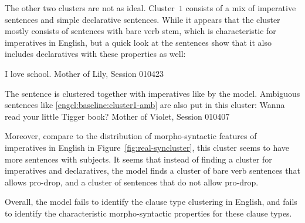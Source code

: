 The other two clusters are not as ideal. Cluster~$1$ consists of a mix of imperative sentences and simple declarative sentences. While it appears that the cluster mostly consists of sentences with bare verb stem, which is characteristic for imperatives in English, but a quick look at the sentences show that it also includes declaratives with these properties as well:

\ex I love school. \hfill Mother of Lily, Session 010423
\eex

The sentence is clustered together with imperatives like  by the model. Ambiguous sentences like \ref{engcl:baseline:cluster1-amb} are also put in this cluster:
Wanna read your little Tigger book? \hfill Mother of Violet, Session 010407
\eex

Moreover, compare to the distribution of morpho-syntactic features of imperatives in English in Figure~\ref{fig:real-syncluster}, this cluster seems to have more sentences with subjects. It seems that instead of finding a cluster for imperatives and declaratives, the model finds a cluster of bare verb sentences that allows pro-drop, and a cluster of sentences that do not allow pro-drop. 

Overall, the \dlearnerabbr{} model fails to identify the clause type clustering in English, and fails to identify the characteristic morpho-syntactic properties for these clause types. 

